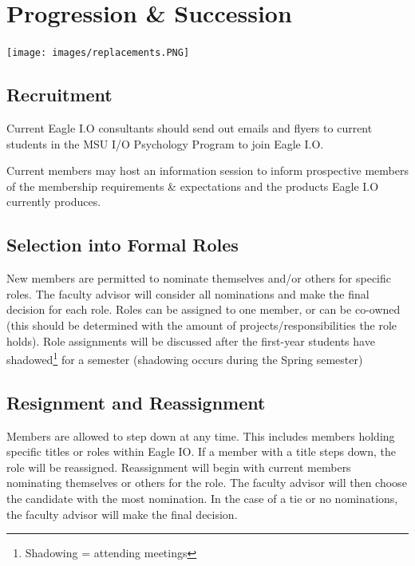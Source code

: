 \documentclass[
]{book}
\begin{document}
\hypertarget{progression-succession}{%
\chapter{Progression \& Succession}\label{progression-succession}}

\texttt{[image: images/replacements.PNG]}

\hypertarget{recruitment}{%
\section{Recruitment}\label{recruitment}}

Current Eagle I.O consultants should send out emails and flyers to current students in the MSU I/O Psychology Program to join Eagle I.O.

Current members may host an information session to inform prospective members of the membership requirements \& expectations and the products Eagle I.O currently produces.

\hypertarget{selection-into-formal-roles}{%
\section{Selection into Formal Roles}\label{selection-into-formal-roles}}

New members are permitted to nominate themselves and/or others for specific roles. The faculty advisor will consider all nominations and make the final decision for each role. Roles can be assigned to one member, or can be co-owned (this should be determined with the amount of projects/responsibilities the role holds). Role assignments will be discussed after the first-year students have shadowed\footnote{Shadowing = attending meetings} for a semester (shadowing occurs during the Spring semester)

\hypertarget{resignment-and-reassignment}{%
\section{Resignment and Reassignment}\label{resignment-and-reassignment}}

Members are allowed to step down at any time. This includes members holding specific titles or roles within Eagle IO. If a member with a title steps down, the role will be reassigned. Reassignment will begin with current members nominating themselves or others for the role. The faculty advisor will then choose the candidate with the most nomination. In the case of a tie or no nominations, the faculty advisor will make the final decision.
\end{document}
